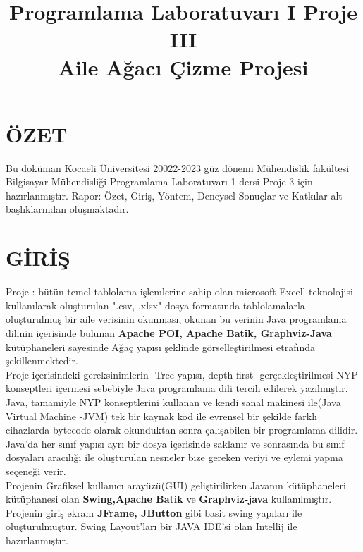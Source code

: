 \documentclass[conference]{IEEEtran}
\begin{document}
\title{Programlama Laboratuvarı I Proje III\\ Aile Ağacı Çizme Projesi}

\author{
\and
{}

}
\maketitle
\section{\textbf{ÖZET}}
Bu doküman  Kocaeli Üniversitesi 20022-2023 güz dönemi Mühendislik fakültesi Bilgisayar Mühendisliği Programlama Laboratuvarı 1 dersi Proje 3 için hazırlanmıştır. Rapor: Özet, Giriş, Yöntem, Deneysel Sonuçlar ve Katkılar alt başlıklarından oluşmaktadır.

\section{\textbf{GİRİŞ}}
    Proje : bütün temel tablolama işlemlerine sahip olan microsoft Excell teknolojisi kullanılarak oluşturulan ".csv, .xlsx" dosya formatında tablolamalarla oluşturulmuş bir aile verisinin okunması, okunan bu verinin Java programlama dilinin içerisinde bulunan \textbf{Apache POI, Apache Batik, Graphviz-Java} kütüphaneleri sayesinde Ağaç yapısı şeklinde görselleştirilmesi etrafında şekillenmektedir. \\

    Proje içerisindeki gereksinimlerin -Tree yapısı, depth first- gerçekleştirilmesi NYP konseptleri içermesi sebebiyle Java programlama dili tercih edilerek yazılmıştır. Java, tamamiyle NYP konseptlerini kullanan ve kendi sanal makinesi ile(Java Virtual Machine -JVM) tek bir kaynak kod ile evrensel bir şekilde farklı cihazlarda bytecode olarak okunduktan sonra çalışabilen bir programlama dilidir. Java'da her sınıf yapısı ayrı bir dosya içerisinde saklanır ve sonrasında bu sınıf dosyaları aracılığı ile oluşturulan nesneler bize gereken veriyi ve eylemi yapma seçeneği verir.\\

    Projenin Grafiksel kullanıcı arayüzü(GUI) geliştirilirken Javanın kütüphaneleri kütüphanesi olan \textbf{Swing,Apache Batik} ve \textbf{Graphviz-java} kullanılmıştır. Projenin giriş ekranı
    \textbf{JFrame, JButton} gibi basit swing yapıları ile oluşturulmuştur. Swing Layout'ları bir JAVA IDE'si olan Intellij ile hazırlanmıştır.\\
    
\end{document}
